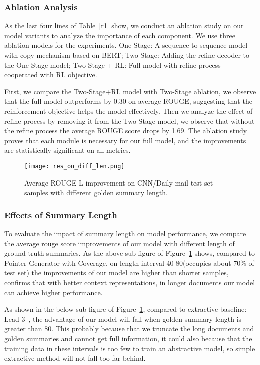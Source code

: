 \documentclass{article}
\begin{document}
\subsubsection{Ablation Analysis}

As the last four lines of Table~\ref{r1} show, we conduct an ablation study on our model variants to analyze the importance of each component. 
We use three ablation models for the experiments. 
One-Stage: A sequence-to-sequence model with copy mechanism based on BERT; 
Two-Stage: Adding the refine decoder to the One-Stage model; 
Two-Stage + RL: Full model with refine process cooperated with RL objective.

First, we compare the Two-Stage+RL model with Two-Stage ablation, we observe that the full model outperforms by 0.30 on average ROUGE, suggesting that the reinforcement objective helps the model effectively. 
Then we analyze the effect of refine process by removing it from the Two-Stage model, we observe that without the refine process the average ROUGE score drops by 1.69. 
The ablation study proves that each module is necessary for our full model, and the improvements are statistically significant on all metrics.

\begin{figure}[htbp]
	\centering
\texttt{[image: res\_on\_diff\_len.png]}
	\makeatletter\def\@captype{figure}\makeatother \caption{Average ROUGE-L improvement on CNN/Daily mail test set samples with different golden summary length.\label{fig:result}}
\end{figure}

\subsubsection{Effects of Summary Length}

To evaluate the impact of summary length on model performance, we compare the average rouge score improvements of our model with different length of ground-truth summaries. 
As the above sub-figure of Figure~\ref{fig:result} shows, compared to Pointer-Generator with Coverage, on length interval 40-80(occupies about 70\% of test set) the improvements of our model are higher than shorter samples, confirms that with better context representations, in longer documents our model can achieve higher performance.

As shown in the below sub-figure of Figure~\ref{fig:result}, compared to extractive baseline: Lead-3~\cite{See2017}, the advantage of our model will fall when golden summary length is greater than 80. This probably because that we truncate the long documents and golden summaries and cannot get full information, it could also because that the training data in these intervals is too few to train an abstractive model, so simple extractive method will not fall too far behind.
\end{document}
